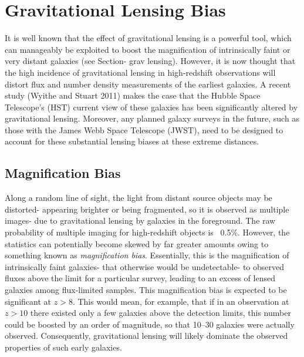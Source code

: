 
\section{Gravitational Lensing Bias} %
\label{sec:gravitational_lensing_bias}
	It is well known that the effect of gravitational lensing is a powerful tool, which can manageably be exploited to boost the magnification of intrinsically faint or very distant galaxies (see Section- grav lensing). However, it is now thought that the high incidence of gravitational lensing in high-redshift observations will distort flux and number density measurements of the earliest galaxies\cite{distortionsinthegravitationallens}. A recent study (Wyithe and Stuart 2011) makes the case that the Hubble Space Telescope's (HST) current view of these galaxies has been significantly altered by gravitational lensing. Moreover, any planned galaxy surveys in the future, such as those with the James Webb Space Telescope (JWST), need to be designed to account for these substantial lensing biases at these extreme distances\cite{wyithestuart2011}.

	\subsection{Magnification Bias} %
	\label{sub:magnification_bias}
		Along a random line of sight, the light from distant source objects may be distorted- appearing brighter or being fragmented, so it is observed as multiple images- due to gravitational lensing by galaxies in the foreground. The raw probability of multiple imaging for high-redshift objects is ~0.5\%. However, the statistics can potentially become skewed by far greater amounts owing to something known as \emph{magnification bias}. Essentially, this is the magnification of intrinsically faint galaxies- that otherwise would be undetectable- to observed fluxes above the limit for a particular survey, leading to an excess of lensed galaxies among flux-limited samples. This magnification bias is expected to be significant at $z>8$. This would mean, for example, that if in an observation at $z>10$ there existed only a few galaxies above the detection limits, this number could be boosted by an order of magnitude, so that 10--30 galaxies were actually observed\cite{Cosmicmagnifyinglenses}. Consequently, gravitational lensing will likely dominate the observed properties of such early galaxies.

